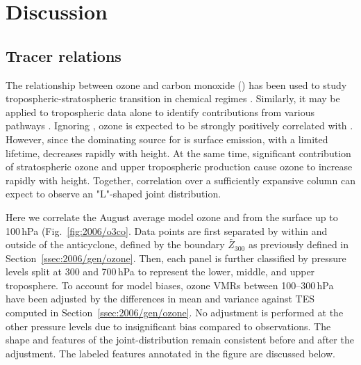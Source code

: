 \ifpdf
    \graphicspath{{Chapter_2006/figures/PNG/}{Chapter_2006/figures/PDF/}{Chapter_2006/figures/}}
\else
    \graphicspath{{Chapter_2006/figures/EPS/}{Chapter_2006/figures/}}
\fi

\section{Discussion}\label{sec:2006/discussion}

\subsection{Tracer relations}\label{ssec:2006/discuss/tracer}

The relationship between ozone and carbon monoxide () has been used to study tropospheric-stratospheric transition in
chemical regimes \citep[e.g.][and references therein]{Pan:2007sw,Hegglin:2009fk}. Similarly, it may be applied to tropospheric data
alone to identify contributions from various pathways \citep[e.g.][]{Zhang:2006zr,Voulgarakis:2011fk,Cristofanelli:2013uq}. Ignoring
, ozone is expected to be strongly positively correlated with  \citep{Chin:1994kx}. However, since the dominating
source for  is surface emission, with a limited lifetime,  decreases rapidly with height. At the same time, significant
contribution of stratospheric ozone and upper tropospheric production cause ozone to increase rapidly with height. Together, 
correlation over a sufficiently expansive column can expect to observe an "L"-shaped joint distribution.


Here we correlate the August average model ozone and  from the surface up to 100\,\unit{hPa} (Fig.~\ref{fig:2006/o3co}.
Data points are first separated by within and outside of the anticyclone, defined by the boundary $\bar{Z}_{300}$ as previously
defined in Section~\ref{ssec:2006/gen/ozone}. Then, each panel is further classified by pressure levels split at 300 and 700\,\unit{hPa}
to represent the lower, middle, and upper troposphere. To account for model biases, ozone VMRs between 100--300\,\unit{hPa}
have been adjusted by the differences in mean and variance against TES computed in Section~\ref{ssec:2006/gen/ozone}. No
adjustment is performed at the other pressure levels due to insignificant bias compared to observations.
The shape and features of the joint-distribution remain consistent before and after the adjustment. The labeled features annotated
in the figure are discussed below.

